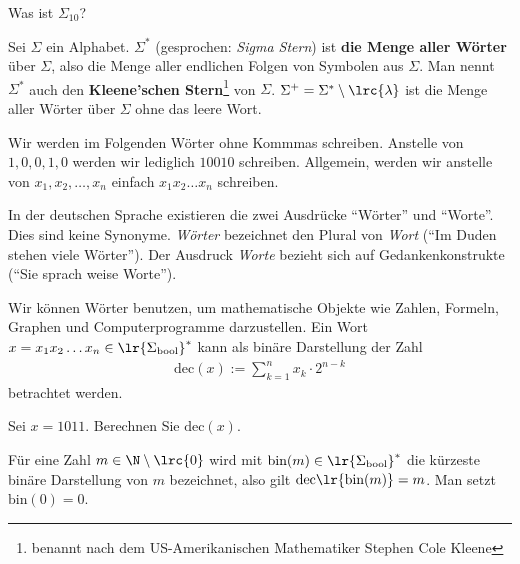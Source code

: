 \begin{myexercise}\label{myexercise:0200}
	Was ist $\Sigma_{10}$?
\end{myexercise}

\begin{mydefinition}
Sei $\Sigma$ ein Alphabet. $\Sigma^*$ (gesprochen: \textit{Sigma Stern}) ist \textbf{die Menge aller Wörter} über $\Sigma$, also die Menge aller endlichen Folgen von Symbolen aus $\Sigma$. Man nennt $\Sigma^{*}$ auch den \textbf{Kleene'schen Stern}\footnote{benannt nach dem US-Amerikanischen Mathematiker Stephen Cole Kleene} von $\Sigma$. $\Sigma^+ = \Sigma^*\setminus\lrc{\lambda}$ ist die Menge aller Wörter über $\Sigma$ ohne das leere Wort.
\end{mydefinition}

Wir werden im Folgenden Wörter ohne Kommmas schreiben. Anstelle von $1,0,0,1,0$ werden wir lediglich $10010$ schreiben. Allgemein, werden wir anstelle von $x_1,x_2,\ldots ,x_n$ einfach $x_1x_2\ldots x_n$ schreiben.
\begin{myremark}
	In der deutschen Sprache existieren die zwei Ausdrücke \enquote{Wörter} und \enquote{Worte}. Dies sind keine Synonyme. \textit{Wörter} bezeichnet den Plural von \textit{Wort} (\enquote{Im Duden stehen viele Wörter}). Der Ausdruck \textit{Worte} bezieht sich auf Gedankenkonstrukte (\enquote{Sie sprach weise Worte}).
\end{myremark}

Wir können Wörter benutzen, um mathematische Objekte wie Zahlen, Formeln, Graphen und Computerprogramme darzustellen. Ein Wort $x = x_1x_2\ldots x_n\in \lr{\Sigma_{\text{bool}}}^*$ kann als binäre Darstellung der Zahl
\begin{align}\label{eq:dec}
	\text{dec}(x):=\displaystyle\sum_{k=1}^n x_k\cdot 2^{n-k}
\end{align}
betrachtet werden.

\begin{myexercise}\label{myexercise:0298}
	Sei $x = 1011$. Berechnen Sie $\text{dec}(x)$.
\end{myexercise}
Für eine Zahl $m\in\N\setminus\lrc{0}$ wird mit $\text{bin}(m)\in \lr{\Sigma_{\text{bool}}}^*$ die kürzeste binäre Darstellung von $m$ bezeichnet, also gilt $\text{dec}\lr{\text{bin}(m)} = m$. Man setzt $\text{bin}(0) = 0$.


